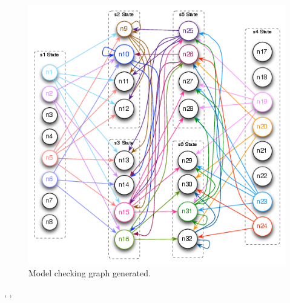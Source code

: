 \documentclass[letterpaper,10pt,english]{sphinxmanual}
\begin{document}
\begin{fulllineitems}
\begin{figure}[htbp]
\includegraphics{example_model_checking_graph.png}
\caption{Model checking graph generated.}\end{figure}




{\hyperref[closure:closure.getClosure]{}}, {\hyperref[formula:formula.Formula]{}}, {\hyperref[modelCheckingGraph:modelCheckingGraph.getAllAtoms]{}}



\end{fulllineitems}

\end{document}
